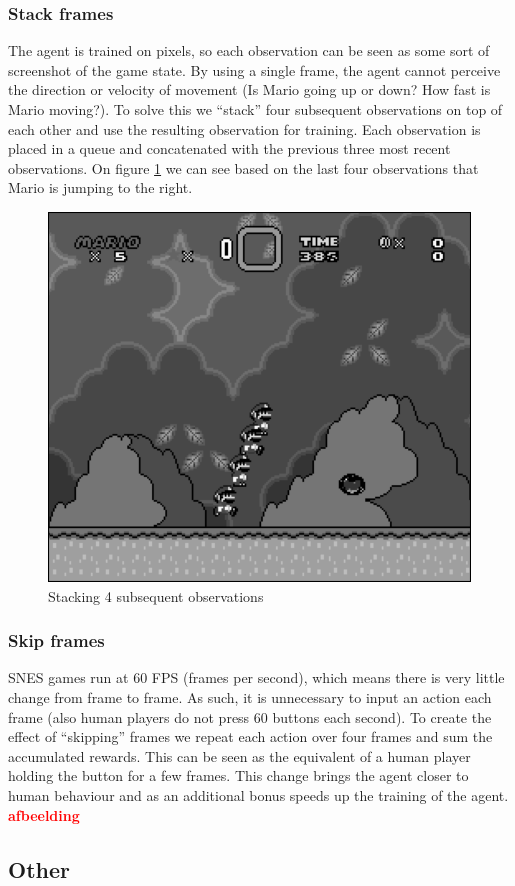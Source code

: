 \documentclass{article}
\begin{document}
\subsubsection{Stack frames}
The agent is trained on pixels, so each observation can be seen as some sort of screenshot of the game state.
By using a single frame, the agent cannot perceive the direction or velocity of movement (Is Mario going up or down? How fast is Mario moving?).
To solve this we ``stack'' four subsequent observations on top of each other and use the resulting observation for training.
Each observation is placed in a queue and concatenated with the previous three most recent observations.
On figure \ref{fig:stack} we can see based on the last four observations that Mario is jumping to the right.
\begin{figure}[ht]
    \centering
    \includegraphics[width=.6\textwidth]{stacked}
    \caption{Stacking 4 subsequent observations}
    \label{fig:stack}
\end{figure}

\subsubsection{Skip frames}
SNES games run at 60 FPS (frames per second), which means there is very little change from frame to frame.
As such, it is unnecessary to input an action each frame (also human players do not press 60 buttons each second).
To create the effect of ``skipping'' frames we repeat each action over four frames and sum the accumulated rewards.
This can be seen as the equivalent of a human player holding the button for a few frames.
This change brings the agent closer to human behaviour and as an additional bonus speeds up the training of the agent.
\textbf{\textcolor{red}{afbeelding}}

\subsection{Other}
\end{document}
